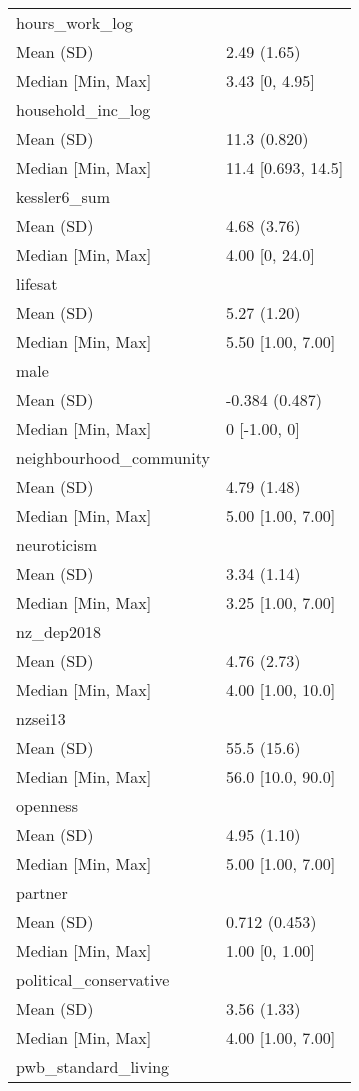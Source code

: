 \documentclass[
  singlecolumn,
  9pt]{article}
\begin{document}
\begin{longtable}[]{@{}ll@{}}
hours\_work\_log & \\
Mean (SD) & 2.49 (1.65) \\
Median {[}Min, Max{]} & 3.43 {[}0, 4.95{]} \\
household\_inc\_log & \\
Mean (SD) & 11.3 (0.820) \\
Median {[}Min, Max{]} & 11.4 {[}0.693, 14.5{]} \\
kessler6\_sum & \\
Mean (SD) & 4.68 (3.76) \\
Median {[}Min, Max{]} & 4.00 {[}0, 24.0{]} \\
lifesat & \\
Mean (SD) & 5.27 (1.20) \\
Median {[}Min, Max{]} & 5.50 {[}1.00, 7.00{]} \\
male & \\
Mean (SD) & -0.384 (0.487) \\
Median {[}Min, Max{]} & 0 {[}-1.00, 0{]} \\
neighbourhood\_community & \\
Mean (SD) & 4.79 (1.48) \\
Median {[}Min, Max{]} & 5.00 {[}1.00, 7.00{]} \\
neuroticism & \\
Mean (SD) & 3.34 (1.14) \\
Median {[}Min, Max{]} & 3.25 {[}1.00, 7.00{]} \\
nz\_dep2018 & \\
Mean (SD) & 4.76 (2.73) \\
Median {[}Min, Max{]} & 4.00 {[}1.00, 10.0{]} \\
nzsei13 & \\
Mean (SD) & 55.5 (15.6) \\
Median {[}Min, Max{]} & 56.0 {[}10.0, 90.0{]} \\
openness & \\
Mean (SD) & 4.95 (1.10) \\
Median {[}Min, Max{]} & 5.00 {[}1.00, 7.00{]} \\
partner & \\
Mean (SD) & 0.712 (0.453) \\
Median {[}Min, Max{]} & 1.00 {[}0, 1.00{]} \\
political\_conservative & \\
Mean (SD) & 3.56 (1.33) \\
Median {[}Min, Max{]} & 4.00 {[}1.00, 7.00{]} \\
pwb\_standard\_living & \\

\end{longtable}
\end{document}
